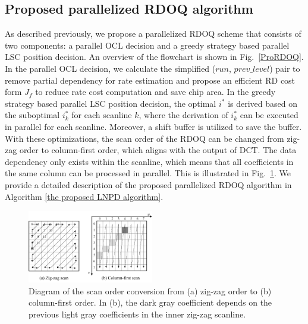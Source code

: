 \documentclass[lettersize,journal]{IEEEtran}
\begin{document}
\subsection{Proposed parallelized RDOQ algorithm}
\label{subsec:paraRDOQ}
As described previously, we propose a parallelized RDOQ scheme that consists of two components: a parallel OCL decision and a greedy strategy based parallel LSC position decision. An overview of the flowchart is shown in Fig.~\ref{ProRDOQ}. In the parallel OCL decision, we calculate the simplified ($run$, $prev\_level$) pair to remove partial dependency for rate estimation and propose an efficient RD cost form $J_{f}$ to reduce rate cost computation and save chip area. In the greedy strategy based parallel LSC position decision, the optimal $i^{*}$ is derived based on the suboptimal $i_{k}^{*}$ for each scanline $k$, where the derivation of $i_{k}^{*}$ can be executed in parallel for each scanline. Moreover, a shift buffer is utilized to save the buffer. With these optimizations, the scan order of the RDOQ can be changed from zig-zag order to column-first order, which aligns with the output of DCT. The data dependency only exists within the scanline, which means that all coefficients in the same column can be processed in parallel. This is illustrated in Fig.~\ref{zig2col}. We provide a detailed description of the proposed parallelized RDOQ algorithm in Algorithm \ref{the proposed LNPD algorithm}. 

\begin{figure}[!b]
	\centering
    \vspace{-10pt}
	\centerline{\includegraphics[width=0.49\textwidth]{figure/zig2col.png}} 
    \vspace{-6pt}
	\caption{Diagram of the scan order conversion from (a) zig-zag order to (b) column-first order. In (b), the dark gray coefficient depends on the previous light gray coefficients in the inner zig-zag scanline.}
	\label{zig2col} %
\end{figure}
\end{document}
